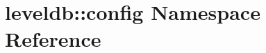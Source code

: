 \hypertarget{namespaceleveldb_1_1config}{}\section{leveldb\+::config Namespace Reference}
\label{namespaceleveldb_1_1config}
